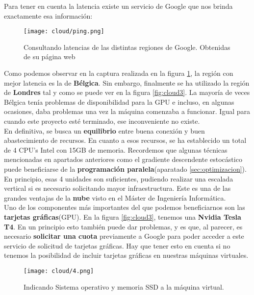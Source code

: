 \documentclass[11pt,fleqn]{book} %
\begin{document}
Para tener en cuenta la latencia existe un servicio de Google que nos brinda exactamente esa información:

\begin{figure}[H]
	\centering\texttt{[image: cloud/ping.png]}
	\caption{Consultando latencias de las distintas regiones de Google. Obtenidas de su página web \cite{article:ping}}
	\label{fig:cloudping} %
\end{figure}

Como podemos observar en la captura realizada en la figura \ref{fig:cloudping}, la región con mejor latencia es la de \textbf{Bélgica}. Sin embargo, finalmente se ha  utilizado la región de \textbf{Londres} tal y como se puede ver en la figura \ref{fig:cloud3}. La mayoría de veces Bélgica tenía problemas de disponibilidad para la GPU e incluso, en algunas ocasiones, daba problemas una vez la máquina comenzaba a funcionar. Igual para cuando este proyecto esté terminado, ese inconveniente no existe. \\

En definitiva, se busca un \textbf{equilibrio} entre buena conexión y buen abastecimiento de recursos. En cuanto a esos recursos, se ha establecido un total de 4 CPU's Intel con 15GB de memoria. Recordemos que algunas técnicas mencionadas en apartados anteriores como el gradiente descendente estocástico puede beneficiarse de la \textbf{programación paralela}(aparatado \ref{sec:optimizacion}). En principio,  esas 4 unidades son suficientes, pudiendo realizar una escalada vertical si es necesario solicitando mayor infraestructura. Este es una de las grandes ventajas de la \textbf{nube} visto en el Máster de Ingeniería Informática. \\

Uno de los componentes más importantes del que podemos beneficiarnos son las \textbf{tarjetas gráficas}(GPU). En la figura \ref{fig:cloud3}, tenemos una \textbf{Nvidia Tesla T4}. En un principio esto también puede dar problemas, y es que, al parecer, es necesario \textbf{solicitar una cuota} previamente a Google para poder acceder a este servicio de solicitud de tarjetas gráficas. Hay que tener esto en cuenta si no tenemos la posibilidad de incluir tarjetas gráficas en nuestras máquinas virtuales.\cite{article:cuota} \\

\begin{figure}[H]
	\centering\texttt{[image: cloud/4.png]}
	\caption{Indicando Sistema operativo y memoria SSD a la máquina virtual.}
	\label{fig:cloud4} %
\end{figure} 
\end{document}
